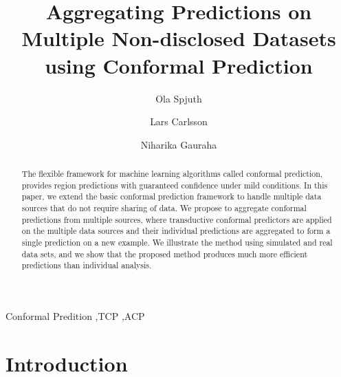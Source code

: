 \documentclass[main]{subfiles}
\begin{document}
\begin{frontmatter}

\title{Aggregating Predictions on Multiple Non-disclosed Datasets using Conformal Prediction}

\author[label1]{Ola Spjuth}
\author[label2]{Lars Carlsson}
\author[label1]{Niharika Gauraha}


\address[label1]{Uppsala University}
\address[label2]{AstraZeneca}

\begin{abstract}
The flexible framework for machine learning algorithms called conformal prediction, provides region predictions with guaranteed confidence under mild conditions. %
In this paper, we extend the basic conformal prediction framework to handle %
multiple data sources that do not require sharing of data.
We propose to aggregate conformal predictions from multiple sources, where transductive conformal predictors are applied on the multiple data sources and their individual predictions are aggregated to form a single prediction on a new example. We illustrate the method using simulated and real data sets, and we show that the proposed method produces much more efficient predictions than individual analysis.
\end{abstract}
\begin{keyword}


Conformal Predition \sep TCP   \sep ACP
\end{keyword}

\end{frontmatter}

\section{Introduction}
\end{document}
